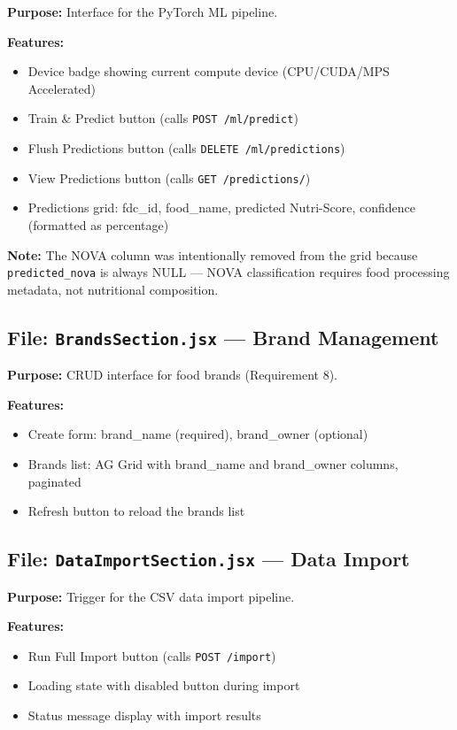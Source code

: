 \documentclass[12pt,a4paper]{article}
\begin{document}
\textbf{Purpose:} Interface for the PyTorch ML pipeline.

\textbf{Features:}
\begin{itemize}[nosep]
    \item Device badge showing current compute device (CPU/CUDA/MPS Accelerated)
    \item Train \& Predict button (calls \texttt{POST /ml/predict})
    \item Flush Predictions button (calls \texttt{DELETE /ml/predictions})
    \item View Predictions button (calls \texttt{GET /predictions/})
    \item Predictions grid: fdc\_id, food\_name, predicted Nutri-Score, confidence (formatted as percentage)
\end{itemize}

\textbf{Note:} The NOVA column was intentionally removed from the grid because \texttt{predicted\_nova} is always NULL — NOVA classification requires food processing metadata, not nutritional composition.

\subsection{File: \texttt{BrandsSection.jsx} — Brand Management}

\textbf{Purpose:} CRUD interface for food brands (Requirement 8).

\textbf{Features:}
\begin{itemize}[nosep]
    \item Create form: brand\_name (required), brand\_owner (optional)
    \item Brands list: AG Grid with brand\_name and brand\_owner columns, paginated
    \item Refresh button to reload the brands list
\end{itemize}

\subsection{File: \texttt{DataImportSection.jsx} — Data Import}

\textbf{Purpose:} Trigger for the CSV data import pipeline.

\textbf{Features:}
\begin{itemize}[nosep]
    \item Run Full Import button (calls \texttt{POST /import})
    \item Loading state with disabled button during import
    \item Status message display with import results
\end{itemize}
\end{document}
